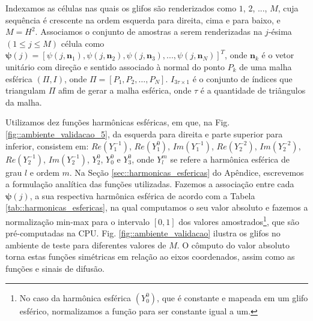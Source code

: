 \documentclass[
    12pt,                %
    oneside,            %
    a4paper,            %
    english,            %
    french,                %
    spanish,            %
    brazil                %
    ]{abntex2}
\begin{document}
Indexamos as células nas quais os glifos são renderizados como $1$, $2$, ..., $M$, cuja sequência é crescente na ordem esquerda para direita, cima e para baixo, e $M = H^2$. Associamos o conjunto de amostras a serem renderizadas na $j$-ésima $(1 \leq j \leq M)$ célula como $\boldsymbol{\psi}(j) = [
\psi(j, \mathbf{n}_1), 
\psi(j, \mathbf{n}_2), 
\psi(j, \mathbf{n}_3), ..., 
\psi(j, \mathbf{n}_N)
]^T$, onde $\mathbf{n}_k$ é o vetor unitário com direção e sentido associado à normal do ponto $P_k$ de uma malha esférica $(\Pi, I)$, onde $\Pi = [P_1, P_2, \dots, P_N]$. $I_{3\tau \times 1}$ é o conjunto de índices que triangulam $\Pi$ afim de gerar a malha esférica, onde $\tau$ é a quantidade de triângulos da malha.%

Utilizamos dez funções harmônicas esféricas, em que, na Fig. \ref{fig::ambiente_validacao_5}, da esquerda para direita e parte superior para inferior, consistem em: $Re(Y_1^{-1})$,
$Re(Y_1^0)$,
$Im(Y_1^{-1})$,
$Re(Y_2^{-2})$,
$Im(Y_2^{-2})$,
$Re(Y_2^{-1})$,
$Im(Y_2^{-1})$,
$Y_2^0$,
$Y_0^0$ e
$Y_3^0$, onde $Y_l^m$ se refere a harmônica esférica de grau $l$ e ordem $m$. Na Seção \ref{sec::harmonicas_esfericas} do Apêndice, escrevemos a formulação analítica das funções utilizadas. Fazemos a associação entre cada $\boldsymbol{\psi}(j)$, a sua respectiva harmônica esférica de acordo com a Tabela \ref{tab::harmonicas_esfericas}, na qual computamos o seu valor absoluto e fazemos a normalização min-max para o intervalo $[0, 1]$ dos valores amostrados\footnote{No caso da harmônica esférica $(Y_0^0)$, que é constante e mapeada em um glifo esférico, normalizamos a função para ser constante igual a um.}, que são pré-computadas na CPU. Fig. \ref{fig::ambiente_validacao} ilustra os glifos no ambiente de teste para diferentes valores de $M$. O cômputo do valor absoluto torna estas funções simétricas em relação ao eixos coordenados, assim como as funções e sinais de difusão.
\end{document}
